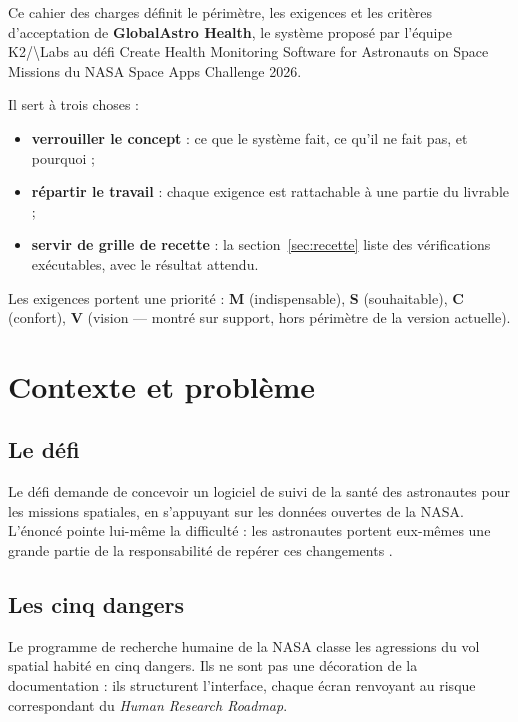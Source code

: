 \documentclass[11pt,a4paper]{article}
\let\sectionorig\section
\renewcommand{\section}{\Needspace{5\baselineskip}\sectionorig}
\newcommand{\kl}{K2/\textbackslash{}Labs}
\begin{document}
Ce cahier des charges d\'efinit le p\'erim\`etre, les exigences et les crit\`eres d'acceptation de
\textbf{GlobalAstro Health}, le syst\`eme propos\'e par l'\'equipe \kl{} au d\'efi \og Create Health
Monitoring Software for Astronauts on Space Missions\fg{} du NASA Space Apps Challenge 2026.

Il sert \`a trois choses :

\begin{itemize}
  \item \textbf{verrouiller le concept} : ce que le syst\`eme fait, ce qu'il ne fait pas, et pourquoi ;
  \item \textbf{r\'epartir le travail} : chaque exigence est rattachable \`a une partie du livrable ;
  \item \textbf{servir de grille de recette} : la section~\ref{sec:recette} liste des v\'erifications
        ex\'ecutables, avec le r\'esultat attendu.
\end{itemize}

Les exigences portent une priorit\'e : \textbf{M} (indispensable), \textbf{S} (souhaitable),
\textbf{C} (confort), \textbf{V} (vision --- montr\'e sur support, hors p\'erim\`etre de la version
actuelle).

\section{Contexte et probl\`eme}

\subsection{Le d\'efi}

Le d\'efi demande de concevoir un logiciel de suivi de la sant\'e des astronautes pour les missions
spatiales, en s'appuyant sur les donn\'ees ouvertes de la NASA. L'\'enonc\'e pointe lui-m\^eme la
difficult\'e : \og les astronautes portent eux-m\^emes une grande partie de la responsabilit\'e de
rep\'erer ces changements \fg{}.

\subsection{Les cinq dangers}

Le programme de recherche humaine de la NASA classe les agressions du vol spatial habit\'e en cinq
dangers. Ils ne sont pas une d\'ecoration de la documentation : ils structurent l'interface, chaque
\'ecran renvoyant au risque correspondant du \emph{Human Research Roadmap}.
\end{document}
